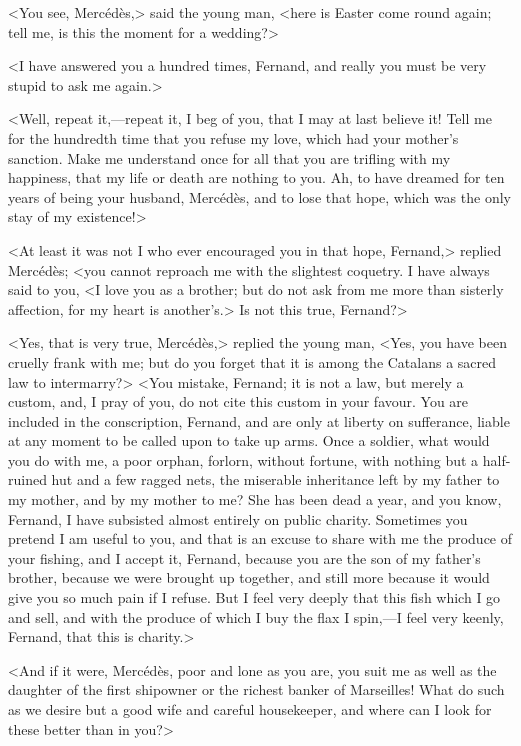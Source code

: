  <You see, Mercédès,> said the young man, <here is Easter come round again; tell me, is this the moment for a wedding?> 

 <I have answered you a hundred times, Fernand, and really you must be very stupid to ask me again.> 

 <Well, repeat it,—repeat it, I beg of you, that I may at last believe it! Tell me for the hundredth time that you refuse my love, which had your mother's sanction. Make me understand once for all that you are trifling with my happiness, that my life or death are nothing to you. Ah, to have dreamed for ten years of being your husband, Mercédès, and to lose that hope, which was the only stay of my existence!> 

 <At least it was not I who ever encouraged you in that hope, Fernand,> replied Mercédès; <you cannot reproach me with the slightest coquetry. I have always said to you, <I love you as a brother; but do not ask from me more than sisterly affection, for my heart is another's.> Is not this true, Fernand?> 

 <Yes, that is very true, Mercédès,> replied the young man, <Yes, you have been cruelly frank with me; but do you forget that it is among the Catalans a sacred law to intermarry?>  <You mistake, Fernand; it is not a law, but merely a custom, and, I pray of you, do not cite this custom in your favour. You are included in the conscription, Fernand, and are only at liberty on sufferance, liable at any moment to be called upon to take up arms. Once a soldier, what would you do with me, a poor orphan, forlorn, without fortune, with nothing but a half-ruined hut and a few ragged nets, the miserable inheritance left by my father to my mother, and by my mother to me? She has been dead a year, and you know, Fernand, I have subsisted almost entirely on public charity. Sometimes you pretend I am useful to you, and that is an excuse to share with me the produce of your fishing, and I accept it, Fernand, because you are the son of my father's brother, because we were brought up together, and still more because it would give you so much pain if I refuse. But I feel very deeply that this fish which I go and sell, and with the produce of which I buy the flax I spin,—I feel very keenly, Fernand, that this is charity.> 

 <And if it were, Mercédès, poor and lone as you are, you suit me as well as the daughter of the first shipowner or the richest banker of Marseilles! What do such as we desire but a good wife and careful housekeeper, and where can I look for these better than in you?> 

